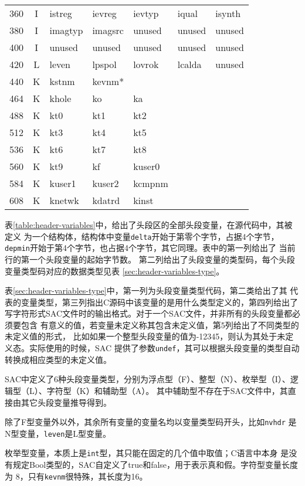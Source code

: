 \begin{table}[H]
\begin{tabular}{c|c|lllll}
	360		&	I	&	istreg	&	ievreg	&	ievtyp	&	iqual	&	isynth	\\
    380		&	I	&	imagtyp &	imagsrc	&	unused	&	unused	&	unused	\\
	400		&	I	&	unused	&	unused	&	unused	&	unused	&	unused	\\
	420		&	L	&	leven	&	lpspol	&	lovrok	&	lcalda	&	unused	\\
	440		&	K	&	kstnm	&	kevnm*	&			&			&			\\
	464		&	K	&	khole	&	ko		&	ka		&			&			\\
	488		&	K	&	kt0		&	kt1		&	kt2		&			&			\\
	512		&	K	&	kt3		&	kt4		&	kt5		&			&			\\
	536		&	K	&	kt6		&	kt7		&	kt8		&			&			\\
	560		&	K	&	kt9		&	kf		&	kuser0	&			&			\\
	584		&	K	&	kuser1	&	kuser2	&	kcmpnm	&			&			\\
	608		&	K	&	knetwk	&	kdatrd	&	kinst	&			&			\\
    \bottomrule
\end{tabular}
\end{table}

表\ref{table:header-variables}中，给出了头段区的全部头段变量，在源代码中，其被定义
为一个结构体，结构体中变量\lstinline{delta}开始于第零个字节，占据4个字节，
\lstinline{depmin}开始于第4个字节，也占据4个字节，其它同理。表中的第一列给出了
当前行的第一个头段变量的起始字节数。
第二列给出了头段变量的类型码，每个头段变量类型码对应的数据类型见表
\ref{sec:header-variables-type}。

表\ref{sec:header-variables-type}中，第一列为头段变量类型代码，第二类给出了其
代表的变量类型，第三列指出C源码中该变量的是用什么类型定义的，第四列给出了
写字符形式SAC文件时的输出格式。对于一个SAC文件，并非所有的头段变量都必须要包含
有意义的值，若变量未定义称其包含未定义值，第5列给出了不同类型的未定义值的形式，
比如如果一个整型头段变量的值为-12345，则认为其处于未定义态。实际使用的时候，SAC
提供了参数\lstinline{undef}，其可以根据头段变量的类型自动转换成相应类型的未定义值。

SAC中定义了6种头段变量类型，分别为浮点型（F）、整型（N）、枚举型（I）、逻辑型（L）、字符型（K）和辅助型（A）。
其中辅助型不存在于SAC文件中，其直接由其它头段变量推导得到。

除了F型变量外以外，其余所有变量的变量名均以变量类型码开头，比如\lstinline{nvhdr}
是N型变量，\lstinline{leven}是L型变量。

枚举型变量，本质上是\lstinline{int}型，其只能在固定的几个值中取值；C语言中本身
是没有规定Bool类型的，SAC自定义了true和false，用于表示真和假。字符型变量长度为
8，只有\lstinline{kevnm}很特殊，其长度为16。

